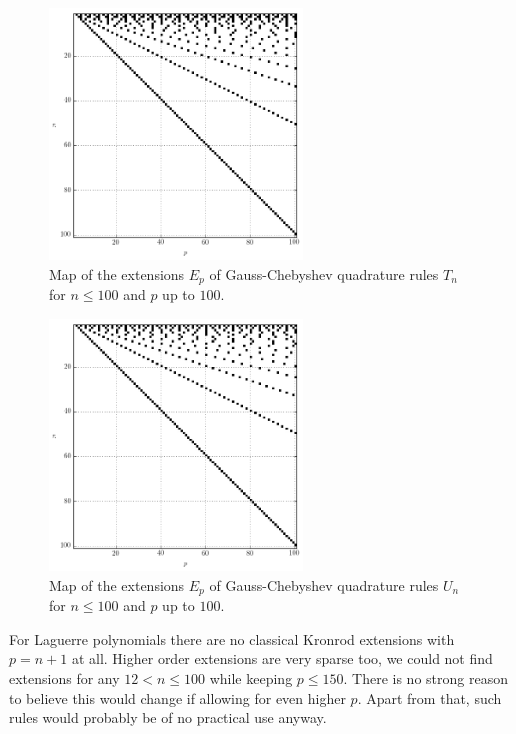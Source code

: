 \documentclass[a4paper,10pt]{article}
\begin{document}
\begin{figure}
  \centering
  \includegraphics[width=0.6\textwidth]{./img/map_chebt_100_100.png}
  \caption{Map of the extensions $E_p$ of Gauss-Chebyshev quadrature rules
           $T_n$ for $n \leq 100$ and $p$ up to $100$.}
  \label{fig:map_chebt_50_50}
\end{figure}

\begin{figure}
  \centering
  \includegraphics[width=0.6\textwidth]{./img/map_chebu_100_100.png}
  \caption{Map of the extensions $E_p$ of Gauss-Chebyshev quadrature rules
           $U_n$ for $n \leq 100$ and $p$ up to $100$.}
  \label{fig:map_leg_100_100}
\end{figure}

For Laguerre polynomials there are no classical Kronrod extensions with $p = n+1$
at all. Higher order extensions are very sparse too, we could not find extensions
for any $12 < n \leq 100$ while keeping $p \leq 150$. There is no strong reason to
believe this would change if allowing for even higher $p$. Apart from that, such
rules would probably be of no practical use anyway.
\end{document}
